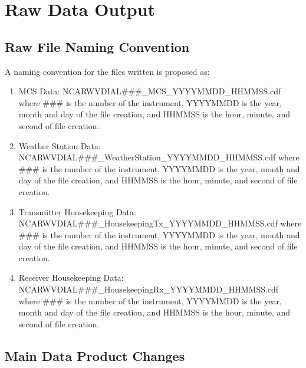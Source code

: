 
\section{Raw Data Output}

\subsection{Raw File Naming Convention}
 A naming convention for the files written is proposed as:

\begin{enumerate}
	\item{MCS Data: NCARWVDIAL\#\#\#\_MCS\_YYYYMMDD\_HHMMSS.cdf where \#\#\# is the number of the instrument, YYYYMMDD is the year, month and day of the file creation, and HHMMSS is the hour, minute, and second of file creation.}
	\item{Weather Station Data: NCARWVDIAL\#\#\#\_WeatherStation\_YYYYMMDD\_HHMMSS.cdf where \#\#\# is the number of the instrument, YYYYMMDD is the year, month and day of the file creation, and HHMMSS is the hour, minute, and second of file creation.}
	\item{Transmitter Housekeeping Data: NCARWVDIAL\#\#\#\_HousekeepingTx\_YYYYMMDD\_HHMMSS.cdf where \#\#\# is the number of the instrument, YYYYMMDD is the year, month and day of the file creation, and HHMMSS is the hour, minute, and second of file creation.}
	\item{Receiver Housekeeping Data: NCARWVDIAL\#\#\#\_HousekeepingRx\_YYYYMMDD\_HHMMSS.cdf where \#\#\# is the number of the instrument, YYYYMMDD is the year, month and day of the file creation, and HHMMSS is the hour, minute, and second of file creation.}
\end{enumerate}

\subsection{Main Data Product Changes}

